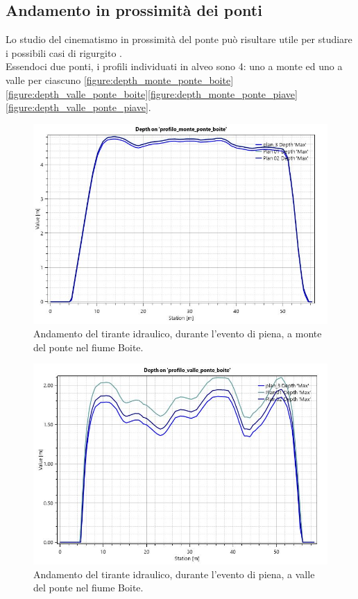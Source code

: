 \subsection{Andamento in prossimità dei ponti}
Lo studio del cinematismo in prossimità del ponte può risultare utile per studiare i possibili casi di rigurgito \cite{rigurgito}.\\
Essendoci due ponti, i profili individuati in alveo sono 4: uno a monte ed uno a valle per ciascuno \eqref{figure:depth_monte_ponte_boite}\eqref{figure:depth_valle_ponte_boite}\eqref{figure:depth_monte_ponte_piave}\eqref{figure:depth_valle_ponte_piave}.

\begin{figure}[H] \centering
    \includegraphics[scale=0.5]{immagini/depth_monte_ponte_boite.JPG}
    \caption{Andamento del tirante idraulico, durante l'evento di piena, a monte del ponte nel fiume Boite.}
    \label{figure:depth_monte_ponte_boite}
\end{figure}

\begin{figure}[H] \centering
    \includegraphics[scale=0.5]{immagini/depth_valle_ponte_boite.JPG}
    \caption{Andamento del tirante idraulico, durante l'evento di piena, a valle del ponte nel fiume Boite.}
    \label{figure:depth_valle_ponte_boite}
\end{figure}

